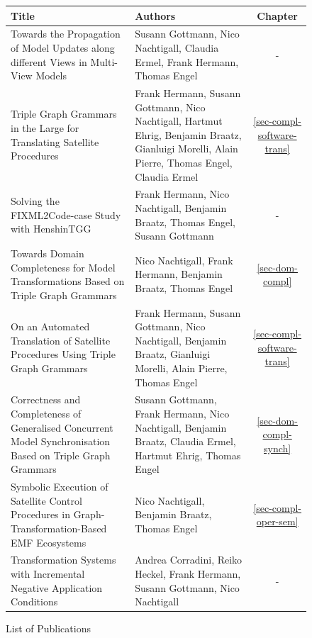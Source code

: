 \begin{figure}[!tb]
\begin{center}
\begin{tabular}{| p{6.5cm} | p{5.5cm} | c |}
  \hline			
  \textbf{Title} & \textbf{Authors} & \textbf{Chapter} \\
  \hline
  Towards the Propagation of Model Updates along different Views in Multi-View Models \cite{DBLP:conf/etaps/GottmannNE0E16} &
  Susann Gottmann, Nico Nachtigall, Claudia Ermel, Frank Hermann, Thomas Engel & 
  - \\
  \hline
  Triple Graph Grammars in the Large for Translating Satellite Procedures \cite{DBLP:conf/icmt/0001GNEBMPEE14} & 
  Frank Hermann, Susann Gottmann, Nico Nachtigall, Hartmut Ehrig, Benjamin Braatz, Gianluigi Morelli, Alain Pierre, Thomas Engel, Claudia Ermel & 
  \cref{sec-compl-software-trans} \\
  \hline
  Solving the FIXML2Code-case Study with HenshinTGG \cite{DBLP:conf/staf/0001NBEG14} & 
  Frank Hermann, Nico Nachtigall, Benjamin Braatz, Thomas Engel, Susann Gottmann & 
  - \\
  \hline
  Towards Domain Completeness for Model Transformations Based on Triple Graph Grammars \cite{DBLP:conf/staf/Nachtigall0BE14} & 
  Nico Nachtigall, Frank Hermann, Benjamin Braatz, Thomas Engel & 
  \cref{sec-dom-compl} \\
  \hline
  On an Automated Translation of Satellite Procedures Using Triple Graph Grammars \cite{DBLP:conf/icmt/HermannGNBMPE13} & 
  Frank Hermann, Susann Gottmann, Nico Nachtigall, Benjamin Braatz, Gianluigi Morelli, Alain Pierre, Thomas Engel & 
  \cref{sec-compl-software-trans} \\
  \hline
  Correctness and Completeness of Generalised Concurrent Model Synchronisation Based on Triple Graph Grammars \cite{DBLP:conf/models/Gottmann0NBEEE13} & 
  Susann Gottmann, Frank Hermann, Nico Nachtigall, Benjamin Braatz, Claudia Ermel, Hartmut Ehrig, Thomas Engel & 
  \cref{sec-dom-compl-synch} \\
  \hline
  Symbolic Execution of Satellite Control Procedures in Graph-Transformation-Based {EMF} Ecosystems \cite{DBLP:conf/models/NachtigallBE13} & 
  Nico Nachtigall, Benjamin Braatz, Thomas Engel & 
  \cref{sec-compl-oper-sem} \\
  \hline			
  Transformation Systems with Incremental Negative Application Conditions \cite{DBLP:conf/wadt/CorradiniHHGN12} & 
  Andrea Corradini, Reiko Heckel, Frank Hermann, Susann Gottmann, Nico Nachtigall & 
  - \\
  \hline  
\end{tabular}
\end{center}
\caption{List of Publications}
\label{fig:sec-gen-intro-org:publications}
\end{figure}

